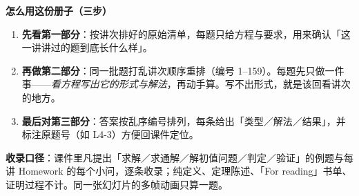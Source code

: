 \documentclass[10.5pt]{ctexart}
\begin{document}
\vspace{0.5cm}
\begin{center}
\begin{minipage}{0.88\linewidth}
\small
\textbf{怎么用这份册子（三步）}
\begin{enumerate}[label=\arabic*.]
  \item \textbf{先看第一部分}：按讲次排好的原始清单，每题只给方程与要求，用来确认「这一讲讲过的题到底长什么样」。
  \item \textbf{再做第二部分}：同一批题打乱讲次顺序重排（编号 1--159）。每题先只做一件事——\emph{看方程写出它的形式与解法}，再动手算。写不出形式，就是该回看讲次的地方。
  \item \textbf{最后对第三部分}：答案按乱序编号排列，每条给出「类型／解法／结果」，并标注原题号（如 L4-3）方便回课件定位。
\end{enumerate}
\vspace{2pt}
\textbf{收录口径}：课件里凡提出「求解／求通解／解初值问题／判定／验证」的例题与每讲 Homework 的每个小问，逐条收录；纯定义、定理陈述、「For reading」书单、证明过程不计。同一张幻灯片的多帧动画只算一题。
\end{minipage}
\end{center}
\clearpage
\end{document}
